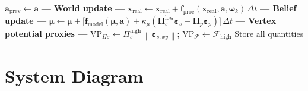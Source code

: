 \documentclass[11pt, a4paper]{article}
\newcommand{\vect}[1]{\bm{#1}}
\newcommand{\mat}[1]{\mathbf{#1}}
\newcommand{\FE}{\mathcal{F}}
\newcommand{\norm}[1]{\left\|#1\right\|}
\newcommand{\Pip}{\mat{\Pi}_p}
\newcommand{\Pisl}{\mat{\Pi}_s^{\text{low}}}
\newcommand{\Pish}{\Pi_s^{\text{high}}}
\newcommand{\epsp}{\vect{\varepsilon}_p}
\newcommand{\epss}{\vect{\varepsilon}_s}
\begin{document}
\begin{algorithm}[H]
\begin{algorithmic}[1]
         $\vect{a}_{\text{prev}} \leftarrow \vect{a}$
  \State
  \State \textbf{--- World update ---}
  \State $\vect{x}_{\text{real}} \leftarrow \vect{x}_{\text{real}}
         + \vect{f}_{\text{proc}}(\vect{x}_{\text{real}},\vect{a},\vect{\omega}_k)\,\Delta t$
  \State
  \State \textbf{--- Belief update ---}
  \State $\vect{\mu} \leftarrow \vect{\mu}
         + \bigl[\vect{f}_{\text{model}}(\vect{\mu},\vect{a})
         + \kappa_\mu(\Pisl\epss - \Pip\epsp)\bigr]\,\Delta t$
  \State
  \State \textbf{--- Vertex potential proxies ---}
  \State $\text{VP}_{\Pi\varepsilon} \leftarrow \Pish\,\norm{\vect{\varepsilon}_{s,xy}}$;\quad
         $\text{VP}_\FE \leftarrow \FE_{\text{high}}$
  \State Store all quantities
\EndFor
\end{algorithmic}
\end{algorithm}

\section{System Diagram}
\end{document}

